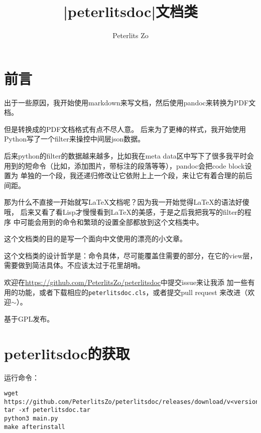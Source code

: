 \documentclass{peterlitsdoc}
\title{\vb|peterlitsdoc|文档类}
\author{Peterlits Zo}
\newcommand{\vb}{\verb}
\begin{document}
\maketitle
\tableofcontents
\newpage


\section{前言}

出于一些原因，我开始使用markdown来写文档，然后使用pandoc来转换为PDF文档。

但是转换成的PDF文档格式有点不尽人意。
后来为了更棒的样式，我开始使用Python写了一个filter来操控中间层json数据。

后来python的filter的数据越来越多，比如我在meta data区中写下了很多我平时会
用到的短命令（比如，添加图片，带标注的段落等等），pandoc会把code block设置为
单独的一个段，我还递归修改让它依附上上一个段，来让它有着合理的前后间距。

那为什么不直接一开始就写\LaTeX{}文档呢？因为我一开始觉得\LaTeX{}的语法好傻哦，
后来又看了看Lisp才慢慢看到\LaTeX{}的美感，于是之后我把我写的filter的程序
中可能会用到的命令和繁琐的设置全部都放到这个文档类中。

这个文档类的目的是写一个面向中文使用的漂亮的小文章。

这个文档类的设计哲学是：命令具体，尽可能覆盖住需要的部分，在它的view层，
需要做到简洁具体。不应该太过于花里胡哨。

欢迎在\url{https://github.com/PeterlitsZo/peterlitsdoc}中提交issue来让我添
加一些有用的功能，或者下载相应的\vb|peterlitsdoc.cls|，或者提交pull request
来改进（欢迎$\sim$）。

基于GPL发布。


\section{peterlitsdoc的获取}

运行命令：
\begin{lstlisting}
wget https://github.com/PeterlitsZo/peterlitsdoc/releases/download/v<version>/peterlitsdoc.tar
tar -xf peterlitsdoc.tar
python3 main.py
make afterinstall
\end{lstlisting}
\end{document}
